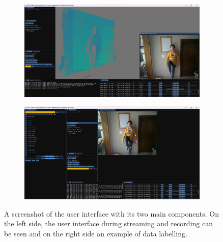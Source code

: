 \begin{figure}
  \centering
  \begin{subfigure}[b]{0.44\linewidth}
      \centering
      \includegraphics[width=\textwidth]{figures/FESDData/streaming.png}
  \end{subfigure}
  \hfill
  \begin{subfigure}[b]{0.44\linewidth}
      \centering
      \includegraphics[width=\textwidth]{figures/FESDData/labelling.png}
  \end{subfigure}
  \caption[FESDData user interface]{A screenshot of the user interface with its two main components. On the left side, the user interface during streaming and recording can be seen and on the right side an example of data labelling.}
  \label{fig:fesddata}
\end{figure}  

